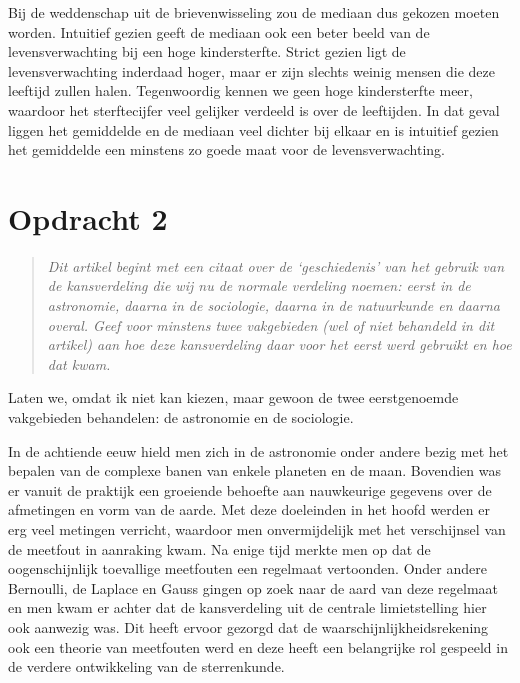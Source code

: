 \documentclass[a4paper,11pt]{article}
\begin{document}
Bij de weddenschap uit de brievenwisseling zou de mediaan dus gekozen moeten
worden. Intuitief gezien geeft de mediaan ook een beter beeld van de
levensverwachting bij een hoge kindersterfte. Strict gezien ligt de
levensverwachting inderdaad hoger, maar er zijn slechts weinig mensen die deze
leeftijd zullen halen. Tegenwoordig kennen we geen hoge kindersterfte meer,
waardoor het sterftecijfer veel gelijker verdeeld is over de leeftijden. In
dat geval liggen het gemiddelde en de mediaan veel dichter bij elkaar en is
intuitief gezien het gemiddelde een minstens zo goede maat voor de
levensverwachting.


\section*{Opdracht 2}


\begin{quote}
\emph{Dit artikel begint met een citaat over de `geschiedenis' van het gebruik
van de kansverdeling die wij nu de normale verdeling noemen: eerst in de
astronomie, daarna in de sociologie, daarna in de natuurkunde en daarna
overal. Geef voor minstens twee vakgebieden (wel of niet behandeld in dit
artikel) aan hoe deze kansverdeling daar voor het eerst werd gebruikt en hoe
dat kwam.}
\end{quote}


Laten we, omdat ik niet kan kiezen, maar gewoon de twee eerstgenoemde
vakgebieden behandelen: de astronomie en de sociologie.

In de achtiende eeuw hield men zich in de astronomie onder andere bezig met
het bepalen van de complexe banen van enkele planeten en de maan. Bovendien
was er vanuit de praktijk een groeiende behoefte aan nauwkeurige gegevens over
de afmetingen en vorm van de aarde. Met deze doeleinden in het hoofd werden er
erg veel metingen verricht, waardoor men onvermijdelijk met het verschijnsel
van de meetfout in aanraking kwam. Na enige tijd merkte men op dat de
oogenschijnlijk toevallige meetfouten een regelmaat vertoonden. Onder andere
Bernoulli, de Laplace en Gauss gingen op zoek naar de aard van deze regelmaat
en men kwam er achter dat de kansverdeling uit de centrale limietstelling hier
ook aanwezig was. Dit heeft ervoor gezorgd dat de waarschijnlijkheidsrekening
ook een theorie van meetfouten werd en deze heeft een belangrijke rol gespeeld
in de verdere ontwikkeling van de sterrenkunde.
\end{document}
